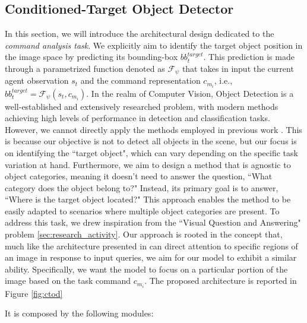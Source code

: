 \subsection{Conditioned-Target Object Detector}
\label{sec:cond_target_obj_detector}
In this section, we will introduce the architectural design dedicated to the \textit{command analysis task}. We explicitly aim to identify the target object position in the image space by predicting its bounding-box $bb_{t}^{target}$. This prediction is made through a parametrized function denoted as $\mathcal{F}_{\psi}$ that takes in input the current agent observation $s_{t}$ and the command representation $c_{m_{i}}$, i.e., $bb_{t}^{target} = \mathcal{F}_{\psi}(s_{t}, c_{m_{i}})$. In the realm of Computer Vision, Object Detection is a well-established and extensively researched problem, with modern methods achieving high levels of performance in detection and classification tasks. However, we cannot directly apply the methods employed in previous work \cite{jiang2023vima, zhu2023viola}. This is because our objective is not to detect all objects in the scene, but our focus is on identifying the ``target object", which can vary depending on the specific task variation at hand. Furthermore, we aim to design a method that is agnostic to object categories, meaning it doesn't need to answer the question, ``What category does the object belong to?" Instead, its primary goal is to answer, ``Where is the target object located?" This approach enables the method to be easily adapted to scenarios where multiple object categories are present.
\newline To address this task, we drew inspiration from the ``Visual Question and Answering" problem \ref{sec:research_activity}. Our approach is rooted in the concept that, much like the architecture presented in \cite{perez2018film} can direct attention to specific regions of an image in response to input queries, we aim for our model to exhibit a similar ability. Specifically, we want the model to focus on a particular portion of the image based on the task command $c_{m_{i}}$.
The proposed architecture is reported in Figure \ref{fig:ctod}

It is composed by the following modules:
